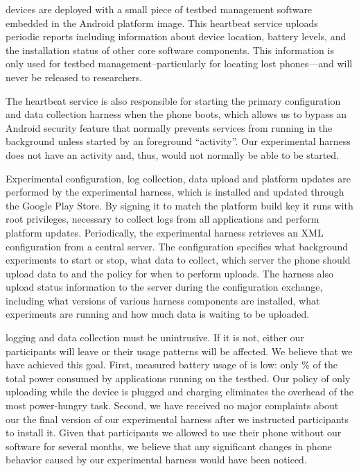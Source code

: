 \PhoneLab{} devices are deployed with a small piece of testbed management
software embedded in the Android platform image. This heartbeat service
uploads periodic reports including information about device location, battery
levels, and the installation status of other core \PhoneLab{} software
components. This information is only used for testbed
management--particularly for locating lost phones---and will never be
released to researchers.

The heartbeat service is also responsible for starting the primary
\PhoneLab{} configuration and data collection harness when the phone boots,
which allows us to bypass an Android security feature that normally prevents
services from running in the background unless started by an foreground
``activity''. Our experimental harness does not have an activity and, thus,
would not normally be able to be started.

Experimental configuration, log collection, data upload and platform updates
are performed by the \PhoneLab{} experimental harness, which is installed and
updated through the Google Play Store. By signing it to match the platform
build key it runs with root privileges, necessary to collect logs from all
applications and perform platform updates. Periodically, the experimental
harness retrieves an XML configuration from a central \PhoneLab{} server. The
configuration specifies what background experiments to start or stop, what
data to collect, which server the phone should upload data to and the policy
for when to perform uploads. The \PhoneLab{} harness also upload status
information to the server during the configuration exchange, including what
versions of various harness components are installed, what experiments are
running and how much data is waiting to be uploaded.

\PhoneLab{} logging and data collection must be unintrusive. If it is not,
either our participants will leave or their usage patterns will be affected.
We believe that we have achieved this goal. First, measured battery usage of
\PhoneLab{} is low: only \% of the total power consumed by
applications running on the testbed. Our policy of only uploading while the
device is plugged and charging eliminates the overhead of the most
power-hungry task. Second, we have received no major complaints about our the
final version of our \PhoneLab{} experimental harness after we instructed
participants to install it. Given that participants we allowed to use their
phone without our software for several months, we believe that any
significant changes in phone behavior caused by our experimental harness
would have been noticed.

